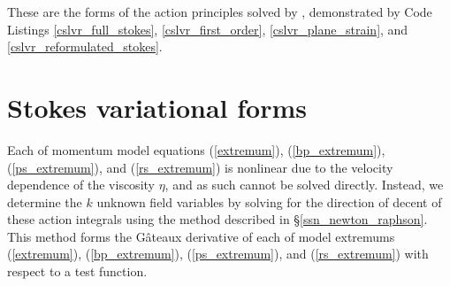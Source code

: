 These are the forms of the action principles solved by \CSLVR, demonstrated by Code Listings \ref{cslvr_full_stokes}, \ref{cslvr_first_order}, \ref{cslvr_plane_strain}, and \ref{cslvr_reformulated_stokes}.

\section{Stokes variational forms} \label{ssn_stokes_variational_forms}
  
Each of momentum model equations (\ref{extremum}), (\ref{bp_extremum}), (\ref{ps_extremum}), and (\ref{rs_extremum}) is nonlinear due to the velocity dependence of the viscosity $\eta$, and as such cannot be solved directly.  Instead, we determine the $k$ unknown field variables by solving for the direction of decent of these action integrals using the method described in \S \ref{ssn_newton_raphson}.  This method forms the G\^{a}teaux derivative of each of model extremums (\ref{extremum}), (\ref{bp_extremum}), (\ref{ps_extremum}), and (\ref{rs_extremum}) with respect to a test function.

